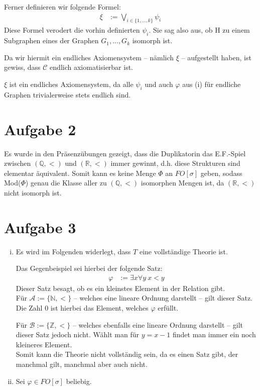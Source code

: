 \documentclass[a4paper,10pt]{article}
\begin{document}
\begin{enumerate}[(i)]
Ferner definieren wir folgende Formel:
\begin{align*}
\xi &:= \bigvee_{i \in \{1,...,k\}} \psi_i
\end{align*}
Diese Formel verodert die vorhin definierten $\psi_i$. Sie sag also aus, ob H zu einem Subgraphen eines der Graphen $G_1,...,G_k$ isomorph ist.

Da wir hiermit ein endliches Axiomensystem -- nämlich $\xi$ -- aufgestellt haben, ist gewiss, dass $\mathcal C$ endlich axiomatisierbar ist.

$\xi$ ist ein endliches Axiomensystem, da alle $\psi_i$ und auch $\varphi$ aus (i) für endliche Graphen trivialerweise stets endlich sind. 

\section*{Aufgabe 2}
Es wurde in den Präsenzübungen gezeigt, dass die Duplikatorin das E.F.-Spiel zwischen $(\mathbb{Q},<)$ und $(\mathbb{R},<)$ immer gewinnt, d.h. diese Strukturen sind elementar äquivalent.
Somit kann es keine Menge $\Phi$ an $FO[\sigma]$ geben, sodass Mod($\Phi$) genau die Klasse aller zu $(\mathbb{Q},<)$ isomorphen Mengen ist, da $(\mathbb{R},<)$ nicht isomorph ist.
\section*{Aufgabe 3}
\begin{enumerate}[(i)]
\item Es wird im Folgenden widerlegt, dass $T$ eine vollständige Theorie ist.

Das Gegenbeispiel sei hierbei der folgende Satz:
\begin{align*}
\varphi &:= \exists x \forall y~ x < y
\end{align*}
Dieser Satz besagt, ob es ein kleinstes Element in der Relation gibt. \\

Für $\mathcal A := \{\mathbb{N},<\}$ -- welches eine lineare Ordnung darstellt -- gilt dieser Satz. Die Zahl $0$ ist hierbei das Element, welches $\varphi$ erfüllt.

Für $\mathcal B := \{\mathbb{Z},<\}$ -- welches ebenfalls eine lineare Ordnung darstellt -- gilt dieser Satz jedoch nicht. Wählt man für $y = x-1$ findet man immer ein noch kleineres Element.\\

Somit kann die Theorie nicht vollständig sein, da es einen Satz gibt, der manchmal gilt, manchmal aber auch nicht. 
\item 
	Sei $\varphi \in FO[\sigma]$ beliebig.
	

\end{enumerate}
\end{enumerate}
\end{document}
